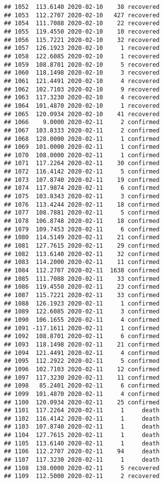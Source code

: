\documentclass[
]{article}
\begin{document}
\begin{verbatim}
## 1052  113.6140 2020-02-10    38 recovered
## 1053  112.2707 2020-02-10   427 recovered
## 1054  111.7088 2020-02-10    22 recovered
## 1055  119.4550 2020-02-10    10 recovered
## 1056  115.7221 2020-02-10    32 recovered
## 1057  126.1923 2020-02-10     1 recovered
## 1058  122.6085 2020-02-10     1 recovered
## 1059  108.8701 2020-02-10     5 recovered
## 1060  118.1498 2020-02-10     3 recovered
## 1061  121.4491 2020-02-10     4 recovered
## 1062  102.7103 2020-02-10     9 recovered
## 1063  117.3230 2020-02-10     4 recovered
## 1064  101.4870 2020-02-10     1 recovered
## 1065  120.0934 2020-02-10    41 recovered
## 1066    9.0000 2020-02-11     2 confirmed
## 1067  103.8333 2020-02-11     2 confirmed
## 1068  128.0000 2020-02-11     1 confirmed
## 1069  101.0000 2020-02-11     1 confirmed
## 1070  108.0000 2020-02-11     1 confirmed
## 1071  117.2264 2020-02-11    30 confirmed
## 1072  116.4142 2020-02-11     5 confirmed
## 1073  107.8740 2020-02-11    19 confirmed
## 1074  117.9874 2020-02-11     6 confirmed
## 1075  103.8343 2020-02-11     3 confirmed
## 1076  113.4244 2020-02-11    18 confirmed
## 1077  108.7881 2020-02-11     5 confirmed
## 1078  106.8748 2020-02-11    18 confirmed
## 1079  109.7453 2020-02-11     6 confirmed
## 1080  114.5149 2020-02-11    21 confirmed
## 1081  127.7615 2020-02-11    29 confirmed
## 1082  113.6140 2020-02-11    32 confirmed
## 1083  114.2000 2020-02-11    11 confirmed
## 1084  112.2707 2020-02-11  1638 confirmed
## 1085  111.7088 2020-02-11    33 confirmed
## 1086  119.4550 2020-02-11    23 confirmed
## 1087  115.7221 2020-02-11    33 confirmed
## 1088  126.1923 2020-02-11     1 confirmed
## 1089  122.6085 2020-02-11     3 confirmed
## 1090  106.1655 2020-02-11     4 confirmed
## 1091 -117.1611 2020-02-11     1 confirmed
## 1092  108.8701 2020-02-11     6 confirmed
## 1093  118.1498 2020-02-11    21 confirmed
## 1094  121.4491 2020-02-11     4 confirmed
## 1095  112.2922 2020-02-11     5 confirmed
## 1096  102.7103 2020-02-11    12 confirmed
## 1097  117.3230 2020-02-11    11 confirmed
## 1098   85.2401 2020-02-11     6 confirmed
## 1099  101.4870 2020-02-11     4 confirmed
## 1100  120.0934 2020-02-11    25 confirmed
## 1101  117.2264 2020-02-11     1     death
## 1102  116.4142 2020-02-11     1     death
## 1103  107.8740 2020-02-11     1     death
## 1104  127.7615 2020-02-11     1     death
## 1105  113.6140 2020-02-11     1     death
## 1106  112.2707 2020-02-11    94     death
## 1107  117.3230 2020-02-11     1     death
## 1108  138.0000 2020-02-11     5 recovered
## 1109  112.5000 2020-02-11     2 recovered

\end{verbatim}
\end{document}
